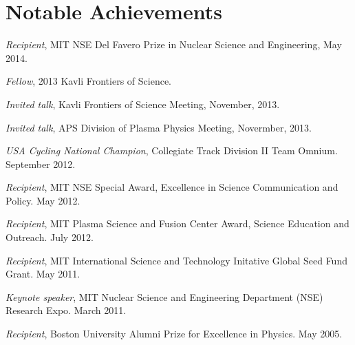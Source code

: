 \documentclass[10pt]{article}
\begin{document}
\section{Notable Achievements}
\begin{innerlist}
\item \textit{Recipient}, MIT NSE Del Favero Prize in Nuclear Science and Engineering, May 2014.
\item \textit{Fellow}, 2013 Kavli Frontiers of Science.
\item \textit{Invited talk}, Kavli Frontiers of Science Meeting, November, 2013.
\item \textit{Invited talk}, APS Division of Plasma Physics Meeting, Novermber, 2013.
\item \textit{USA Cycling National Champion}, Collegiate Track Division II Team Omnium. September 2012.
\item \textit{Recipient}, MIT NSE Special Award, Excellence in Science Communication and Policy. May 2012.
\item \textit{Recipient}, MIT Plasma Science and Fusion Center Award, Science Education and Outreach. July 2012.
\item \textit{Recipient}, MIT International Science and Technology Initative Global Seed Fund Grant. May 2011.
\item \textit{Keynote speaker}, MIT Nuclear Science and Engineering Department (NSE) Research Expo. March 2011.
\item \textit{Recipient}, Boston University Alumni Prize for Excellence in Physics. May 2005.
\end{innerlist}
\end{document}
